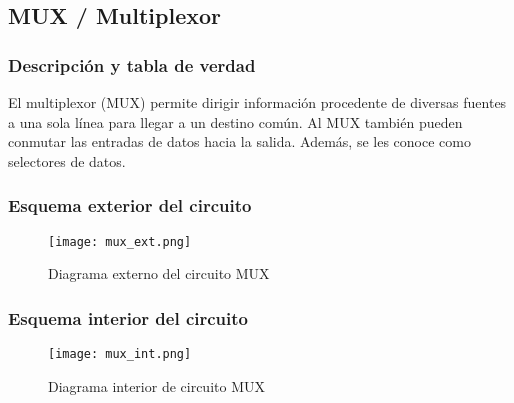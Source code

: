 \documentclass[12pt]{article}
\begin{document}
    \subsection{MUX / Multiplexor}
        \subsubsection{Descripción y tabla de verdad}

            El multiplexor (MUX) permite dirigir información procedente de diversas fuentes a una sola línea para llegar a un destino común. Al MUX también pueden conmutar las entradas de datos hacia la salida. Además, se les conoce como selectores de datos. 
            \begin{table}[H]
            \centering
            \caption{Tabla de verdad de MUX}
            \label{tab:mux}
            \end{table}
        \subsubsection{Esquema exterior del circuito}
            \begin{figure}[H]
                \centering
                \texttt{[image: mux\_ext.png]}
                \caption{Diagrama externo del circuito MUX} \cite{diagram}
                \label{fig:mux_ext}
            \end{figure}
        \subsubsection{Esquema interior del circuito}
            \begin{figure}[H]
                \centering
                \texttt{[image: mux\_int.png]}
                \caption{Diagrama interior de circuito MUX} \cite{diagram}
                \label{fig:mux_int}
            \end{figure}
\end{document}
